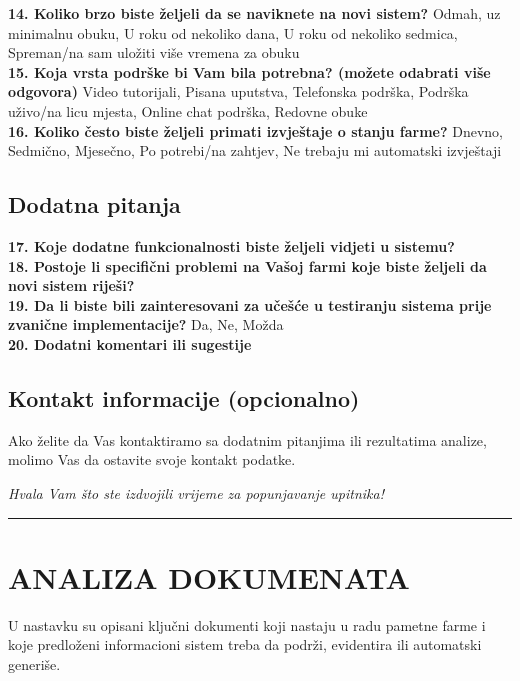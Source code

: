 \documentclass{article}
\begin{document}
\textbf{14. Koliko brzo biste željeli da se naviknete na novi sistem?} Odmah, uz minimalnu obuku, U roku od nekoliko dana, U roku od nekoliko sedmica, Spreman/na sam uložiti više vremena za obuku
\\
\textbf{15. Koja vrsta podrške bi Vam bila potrebna? (možete odabrati više odgovora)} Video tutorijali, Pisana uputstva, Telefonska podrška, Podrška uživo/na licu mjesta, Online chat podrška, Redovne obuke
\\
\textbf{16. Koliko često biste željeli primati izvještaje o stanju farme?} Dnevno, Sedmično, Mjesečno, Po potrebi/na zahtjev, Ne trebaju mi automatski izvještaji

\subsection{Dodatna pitanja}

\textbf{17. Koje dodatne funkcionalnosti biste željeli vidjeti u sistemu?}
\\
\textbf{18. Postoje li specifični problemi na Vašoj farmi koje biste željeli da novi sistem riješi?}
\\
\textbf{19. Da li biste bili zainteresovani za učešće u testiranju sistema prije zvanične implementacije?} Da, Ne, Možda
\\
\textbf{20. Dodatni komentari ili sugestije}

\subsection{Kontakt informacije (opcionalno)}

Ako želite da Vas kontaktiramo sa dodatnim pitanjima ili rezultatima analize, molimo Vas da ostavite svoje kontakt podatke.

\vspace{0.5cm}

\textit{Hvala Vam što ste izdvojili vrijeme za popunjavanje upitnika!}

\vspace{1em}
\hspace{-1.75em}
\rule{\linewidth}{0.4pt}

\newpage

\section{ANALIZA DOKUMENATA}

U nastavku su opisani ključni dokumenti koji nastaju u radu pametne farme i koje predloženi informacioni sistem treba da podrži, evidentira ili automatski generiše.
\end{document}
